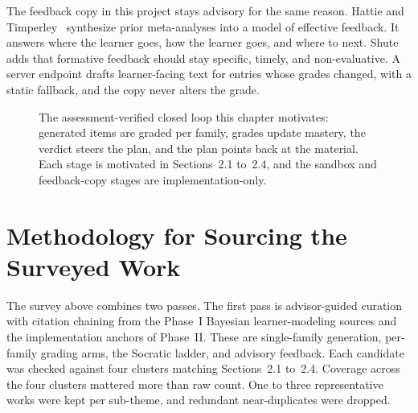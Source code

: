 The feedback copy in this project stays advisory for the same reason. Hattie and Timperley~\cite{hattie2007} synthesize prior meta-analyses into a model of effective feedback. It answers where the learner goes, how the learner goes, and where to next. Shute~\cite{shute2008} adds that formative feedback should stay specific, timely, and non-evaluative. A server endpoint drafts learner-facing text for entries whose grades changed, with a static fallback, and the copy never alters the grade.

\begin{figure}[htbp]
\centering
{}
\caption{The assessment-verified closed loop this chapter motivates: generated items are graded per family, grades update mastery, the verdict steers the plan, and the plan points back at the material. Each stage is motivated in Sections~2.1 to~2.4, and the sandbox and feedback-copy stages are implementation-only.}
\label{fig:closed-loop}
\end{figure}

\section{Methodology for Sourcing the Surveyed Work}
The survey above combines two passes. The first pass is advisor-guided curation with citation chaining from the Phase~I Bayesian learner-modeling sources and the implementation anchors of Phase~II. These are single-family generation, per-family grading arms, the Socratic ladder, and advisory feedback. Each candidate was checked against four clusters matching Sections~2.1 to~2.4. Coverage across the four clusters mattered more than raw count. One to three representative works were kept per sub-theme, and redundant near-duplicates were dropped.

